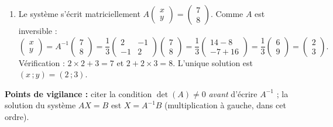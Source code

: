 \documentclass[11pt]{article}
\begin{document}
\begin{corrige}
\begin{enumerate}
\item Le système s'écrit matriciellement $A\begin{pmatrix} x \\ y \end{pmatrix}=\begin{pmatrix} 7 \\ 8 \end{pmatrix}$. Comme $A$ est inversible :
\[ \begin{pmatrix} x \\ y \end{pmatrix}=A^{-1}\begin{pmatrix} 7 \\ 8 \end{pmatrix}=\frac{1}{3}\begin{pmatrix} 2 & -1 \\ -1 & 2 \end{pmatrix}\begin{pmatrix} 7 \\ 8 \end{pmatrix}=\frac{1}{3}\begin{pmatrix} 14-8 \\ -7+16 \end{pmatrix}=\frac{1}{3}\begin{pmatrix} 6 \\ 9 \end{pmatrix}=\begin{pmatrix} 2 \\ 3 \end{pmatrix}. \]
Vérification : $2\times2+3=7$ et $2+2\times3=8$. L'unique solution est $(x\,;y)=(2\,;3)$.
\end{enumerate}
\textbf{Points de vigilance :} citer la condition $\det(A)\neq0$ \emph{avant} d'écrire $A^{-1}$ ; la solution du système $AX=B$ est $X=A^{-1}B$ (multiplication à gauche, dans cet ordre).
\end{corrige}
\end{document}
